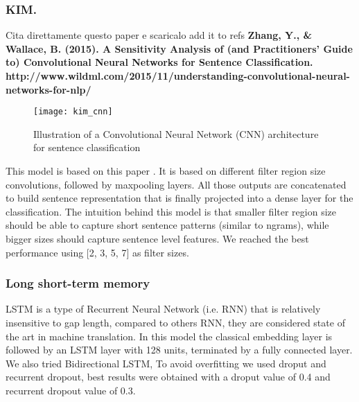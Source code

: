 \subsubsection{KIM.}

Cita direttamente questo paper e scaricalo add it to refs
\textbf{Zhang, Y., \& Wallace, B. (2015). A Sensitivity Analysis of (and Practitioners’ Guide to) Convolutional Neural Networks for Sentence Classification.}
\textbf{http://www.wildml.com/2015/11/understanding-convolutional-neural-networks-for-nlp/}

\begin{figure}[h]
	\centering
	\texttt{[image: kim\_cnn]}
	\caption{Illustration of a Convolutional Neural Network (CNN) architecture for sentence classification}
	\label{fig:kim}
\end{figure}

This model is based on this paper \cite{kim2014convolutional}. It is based on different filter region size convolutions, followed by maxpooling layers.
All those outputs are concatenated to build sentence representation that is finally projected into a dense layer for the classification.
The intuition behind this model is that smaller filter region size should be able to capture short sentence patterns (similar to ngrams), while bigger sizes should capture sentence level features. We reached the best performance using [2, 3, 5, 7] as filter sizes.


\subsubsection{Long short-term memory}
LSTM is a type of Recurrent Neural Network (i.e. RNN) that is relatively insensitive to gap length, compared to others RNN, they are considered state of the art in machine translation.
In this model the classical embedding layer is followed by an LSTM layer with 128 units, terminated by a fully connected layer.
We also tried Bidirectional LSTM, 
To avoid overfitting we used droput and recurrent dropout, best results were obtained with a droput value of 0.4 and recurrent dropout value of 0.3.

